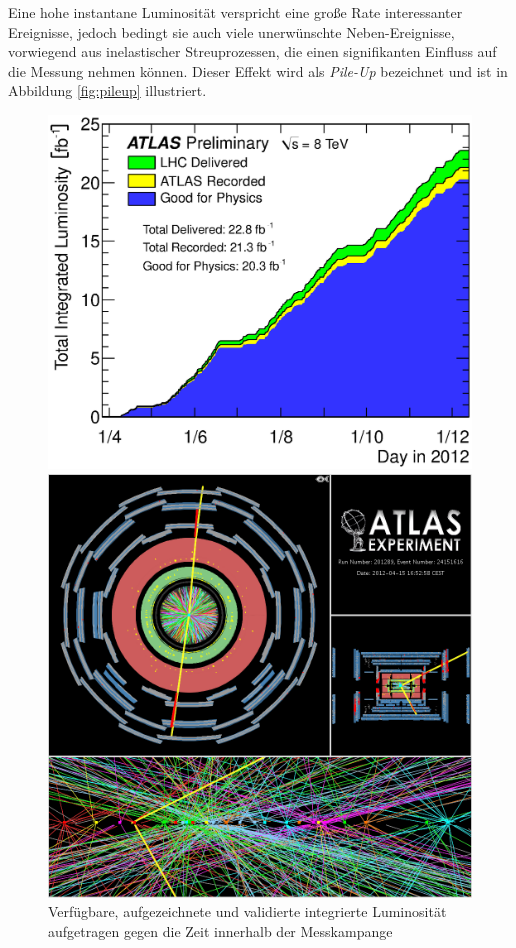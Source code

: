 Eine hohe instantane Luminosität verspricht eine große Rate interessanter
Ereignisse, jedoch bedingt sie auch viele unerwünschte Neben-Ereignisse,
vorwiegend aus inelastischer Streuprozessen, die einen signifikanten Einfluss
auf die Messung nehmen können. Dieser Effekt wird als \textit{Pile-Up}
bezeichnet und ist in Abbildung \ref{fig:pileup} illustriert.

\begin{figure}
    \begin{minipage}[b]{0.48\textwidth}
        \centering
        \includegraphics[width=1.\textwidth]{plots/lumi}
        \captionsetup{format=plain}
        \caption{Verfügbare, aufgezeichnete und validierte integrierte
            Luminosität aufgetragen gegen die Zeit innerhalb der Messkampange}
        \label{fig:lumi}
    \end{minipage}
    \hfill
    \begin{minipage}[b]{0.48\textwidth}
        \centering
        \includegraphics[width=1.\textwidth]{img/pileup}

\end{minipage}
\end{figure}
